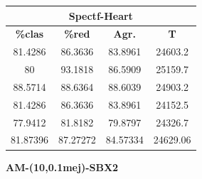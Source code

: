 \documentclass[11pt,a4paper]{article}
\theoremstyle{definition}
\begin{document}
\begin{tabbing}
{		\begin{tabular}{|c|c|c|c|}
			\hline
			\multicolumn{4}{|c|}{\textbf{Spectf-Heart}} \\ \hline
			\textbf{\%clas} & \textbf{\%red} & \textbf{Agr.} & \textbf{T} \\ \hline 
			81.4286 & 86.3636 & 83.8961 & 24603.2 \\ \hline
80 & 93.1818 & 86.5909 & 25159.7 \\ \hline
88.5714 & 88.6364 & 88.6039 & 24903.2 \\ \hline
81.4286 & 86.3636 & 83.8961 & 24152.5 \\ \hline
77.9412 & 81.8182 & 79.8797 & 24326.7 \\ \hline
81.87396 & 87.27272 & 84.57334 & 24629.06 \\ \hline
		\end{tabular}
		}
	\end{tabbing}
	
	\textbf{AM-(10,0.1mej)-SBX2}	
	
\end{document}
